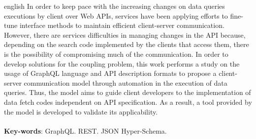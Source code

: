 \begin{resumo}[Abstract]
  \begin{otherlanguage*}{english}
    In order to keep pace with the increasing changes on data queries executions by client over Web APIs, services have been applying efforts to fine-tune interface methods to maintain efficient client-server communication. However, there are services difficulties in managing changes in the API because, depending on the search code implemented by the clients that access them, there is the possibility of compromising much of the communication. In order to develop solutions for the coupling problem, this work performs a study on the usage of GraphQL language and API description formats to propose a client-server communication model through automation in the execution of data queries. Thus, the model aims to guide client developers to the implementation of data fetch codes independent on API specification. As a result, a tool provided by the model is developed to validate its applicability. \\ \\
    \textbf{Key-words}: GraphQL. REST. JSON Hyper-Schema.
  \end{otherlanguage*}
\end{resumo}
